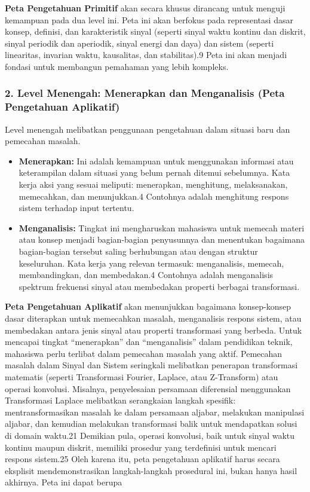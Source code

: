 \documentclass[
  letterpaper,
  DIV=11,
  numbers=noendperiod]{scrreprt}
\begin{document}
\textbf{Peta Pengetahuan Primitif} akan secara khusus dirancang untuk
menguji kemampuan pada dua level ini. Peta ini akan berfokus pada
representasi dasar konsep, definisi, dan karakteristik sinyal (seperti
sinyal waktu kontinu dan diskrit, sinyal periodik dan aperiodik, sinyal
energi dan daya) dan sistem (seperti linearitas, invarian waktu,
kausalitas, dan stabilitas).9 Peta ini akan menjadi fondasi untuk
membangun pemahaman yang lebih kompleks.

\subsubsection{2. Level Menengah: Menerapkan dan Menganalisis (Peta
Pengetahuan
Aplikatif)}\label{level-menengah-menerapkan-dan-menganalisis-peta-pengetahuan-aplikatif}

Level menengah melibatkan penggunaan pengetahuan dalam situasi baru dan
pemecahan masalah.

\begin{itemize}
\item
  \textbf{Menerapkan:} Ini adalah kemampuan untuk menggunakan informasi
  atau keterampilan dalam situasi yang belum pernah ditemui sebelumnya.
  Kata kerja aksi yang sesuai meliputi: menerapkan, menghitung,
  melaksanakan, memecahkan, dan menunjukkan.4 Contohnya adalah
  menghitung respons sistem terhadap input tertentu.
\item
  \textbf{Menganalisis:} Tingkat ini mengharuskan mahasiswa untuk
  memecah materi atau konsep menjadi bagian-bagian penyusunnya dan
  menentukan bagaimana bagian-bagian tersebut saling berhubungan atau
  dengan struktur keseluruhan. Kata kerja yang relevan termasuk:
  menganalisis, memecah, membandingkan, dan membedakan.4 Contohnya
  adalah menganalisis spektrum frekuensi sinyal atau membedakan properti
  berbagai transformasi.
\end{itemize}

\textbf{Peta Pengetahuan Aplikatif} akan menunjukkan bagaimana
konsep-konsep dasar diterapkan untuk memecahkan masalah, menganalisis
respons sistem, atau membedakan antara jenis sinyal atau properti
transformasi yang berbeda. Untuk mencapai tingkat ``menerapkan'' dan
``menganalisis'' dalam pendidikan teknik, mahasiswa perlu terlibat dalam
pemecahan masalah yang aktif. Pemecahan masalah dalam Sinyal dan Sistem
seringkali melibatkan penerapan transformasi matematis (seperti
Transformasi Fourier, Laplace, atau Z-Transform) atau operasi konvolusi.
Misalnya, penyelesaian persamaan diferensial menggunakan Transformasi
Laplace melibatkan serangkaian langkah spesifik: mentransformasikan
masalah ke dalam persamaan aljabar, melakukan manipulasi aljabar, dan
kemudian melakukan transformasi balik untuk mendapatkan solusi di domain
waktu.21 Demikian pula, operasi konvolusi, baik untuk sinyal waktu
kontinu maupun diskrit, memiliki prosedur yang terdefinisi untuk mencari
respons sistem.25 Oleh karena itu, peta pengetahuan aplikatif harus
secara eksplisit mendemonstrasikan langkah-langkah prosedural ini, bukan
hanya hasil akhirnya. Peta ini dapat berupa
\end{document}
